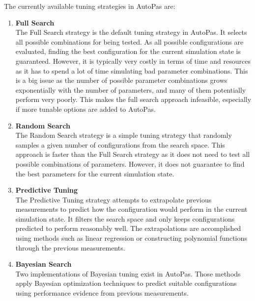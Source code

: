 The currently available tuning strategies in AutoPas are:


\begin{enumerate}
      \item \textbf{Full Search} \\
            The Full Search strategy is the default tuning strategy in AutoPas. It selects all possible combinations for being tested. As all possible configurations are evaluated, finding the best configuration for the current simulation state is guaranteed. However, it is typically very costly in terms of time and resources as it has to spend a lot of time simulating bad parameter combinations. This is a big issue as the number of possible parameter combinations grows exponentially with the number of parameters, and many of them potentially perform very poorly. This makes the full search approach infeasible, especially if more tunable options are added to AutoPas.

      \item \textbf{Random Search} \\
            The Random Search strategy is a simple tuning strategy that randomly samples a given number of configurations from the search space. This approach is faster than the Full Search strategy as it does not need to test all possible combinations of parameters. However, it does not guarantee to find the best parameters for the current simulation state.

      \item \textbf{Predictive Tuning} \\
            The Predictive Tuning strategy attempts to extrapolate previous measurements to predict how the configuration would perform in the current simulation state. It filters the search space and only keeps configurations predicted to perform reasonably well. The extrapolations are accomplished using methods such as linear regression or constructing polynomial functions through the previous measurements.

      \item \textbf{Bayesian Search} \\
            Two implementations of Bayesian tuning exist in AutoPas. Those methods apply Bayesian optimization techniques to predict suitable configurations using performance evidence from previous measurements.


\end{enumerate}
